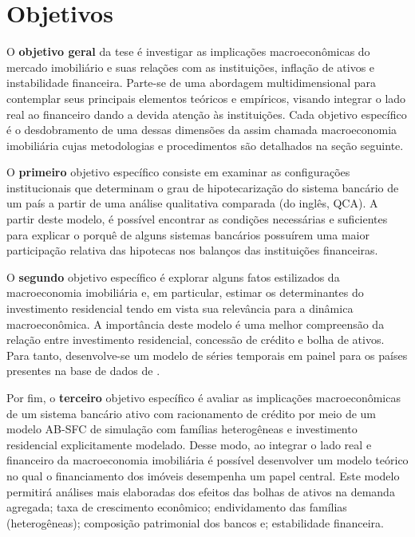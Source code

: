 \section{Objetivos}\label{OBJ}

O \textbf{objetivo geral} da tese é investigar as implicações macroeconômicas do mercado imobiliário e suas relações com as instituições, inflação de ativos e instabilidade financeira. 
Parte-se de uma abordagem multidimensional para contemplar seus principais elementos teóricos e empíricos, visando integrar o lado real ao financeiro dando a devida atenção às instituições. %
Cada objetivo específico é o desdobramento de uma dessas dimensões da assim chamada macroeconomia imobiliária cujas metodologias e procedimentos são detalhados na seção seguinte. 

O \textbf{primeiro} objetivo específico consiste em examinar as configurações institucionais que determinam o grau de hipotecarização do sistema bancário de um país a partir de uma análise qualitativa comparada (do inglês, QCA). A partir deste modelo, é possível encontrar as condições necessárias e suficientes para explicar o porquê de alguns sistemas bancários possuírem uma maior participação relativa das hipotecas nos balanços das instituições financeiras.

O \textbf{segundo} objetivo específico é explorar alguns fatos estilizados da macroeconomia imobiliária e, em particular,  estimar os determinantes do investimento residencial tendo em vista sua relevância para a dinâmica macroeconômica. 
A importância deste modelo é uma melhor compreensão da relação entre investimento residencial, concessão de crédito e bolha de ativos. %
Para tanto, desenvolve-se um modelo de séries temporais em painel para os países presentes na base de dados de \textcite{jorda_rate_2019}. 

Por fim, o \textbf{terceiro} objetivo específico é avaliar as implicações macroeconômicas de um sistema bancário ativo com racionamento de crédito por meio de um modelo AB-SFC de simulação com famílias heterogêneas e investimento residencial explicitamente modelado. 
Desse modo, ao integrar o lado real e financeiro da macroeconomia imobiliária é possível desenvolver um modelo teórico no qual o financiamento dos imóveis desempenha um papel central.
Este modelo permitirá análises mais elaboradas dos efeitos das bolhas de ativos na demanda agregada; taxa de crescimento econômico; endividamento das famílias (heterogêneas); composição patrimonial dos bancos e; estabilidade financeira.


